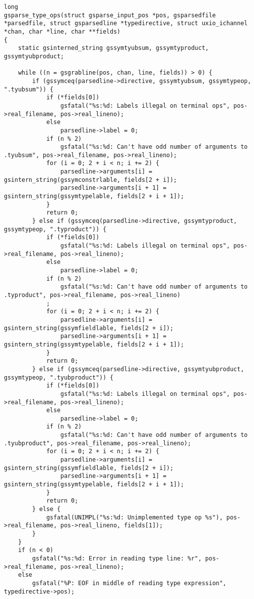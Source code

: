 \documentclass{report}
\begin{document}
\begin{verbatim}
long
gsparse_type_ops(struct gsparse_input_pos *pos, gsparsedfile *parsedfile, struct gsparsedline *typedirective, struct uxio_ichannel *chan, char *line, char **fields)
{
    static gsinterned_string gssymtyubsum, gssymtyproduct, gssymtyubproduct;

    while ((n = gsgrabline(pos, chan, line, fields)) > 0) {
        if (gssymceq(parsedline->directive, gssymtyubsum, gssymtypeop, ".tyubsum")) {
            if (*fields[0])
                gsfatal("%s:%d: Labels illegal on terminal ops", pos->real_filename, pos->real_lineno);
            else
                parsedline->label = 0;
            if (n % 2)
                gsfatal("%s:%d: Can't have odd number of arguments to .tyubsum", pos->real_filename, pos->real_lineno);
            for (i = 0; 2 + i < n; i += 2) {
                parsedline->arguments[i] = gsintern_string(gssymconstrlable, fields[2 + i]);
                parsedline->arguments[i + 1] = gsintern_string(gssymtypelable, fields[2 + i + 1]);
            }
            return 0;
        } else if (gssymceq(parsedline->directive, gssymtyproduct, gssymtypeop, ".typroduct")) {
            if (*fields[0])
                gsfatal("%s:%d: Labels illegal on terminal ops", pos->real_filename, pos->real_lineno);
            else
                parsedline->label = 0;
            if (n % 2)
                gsfatal("%s:%d: Can't have odd number of arguments to .typroduct", pos->real_filename, pos->real_lineno)
            ;
            for (i = 0; 2 + i < n; i += 2) {
                parsedline->arguments[i] = gsintern_string(gssymfieldlable, fields[2 + i]);
                parsedline->arguments[i + 1] = gsintern_string(gssymtypelable, fields[2 + i + 1]);
            }
            return 0;
        } else if (gssymceq(parsedline->directive, gssymtyubproduct, gssymtypeop, ".tyubproduct")) {
            if (*fields[0])
                gsfatal("%s:%d: Labels illegal on terminal ops", pos->real_filename, pos->real_lineno);
            else
                parsedline->label = 0;
            if (n % 2)
                gsfatal("%s:%d: Can't have odd number of arguments to .tyubproduct", pos->real_filename, pos->real_lineno);
            for (i = 0; 2 + i < n; i += 2) {
                parsedline->arguments[i] = gsintern_string(gssymfieldlable, fields[2 + i]);
                parsedline->arguments[i + 1] = gsintern_string(gssymtypelable, fields[2 + i + 1]);
            }
            return 0;
        } else {
            gsfatal(UNIMPL("%s:%d: Unimplemented type op %s"), pos->real_filename, pos->real_lineno, fields[1]);
        }
    }
    if (n < 0)
        gsfatal("%s:%d: Error in reading type line: %r", pos->real_filename, pos->real_lineno);
    else
        gsfatal("%P: EOF in middle of reading type expression", typedirective->pos);


\end{verbatim}
\end{document}
